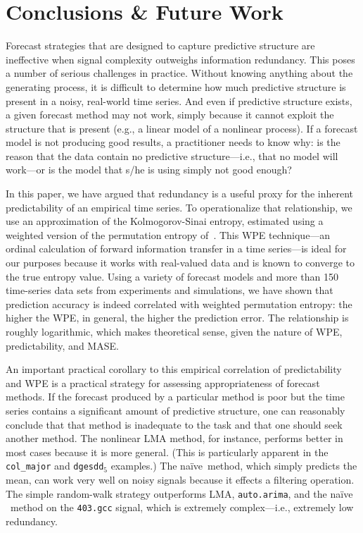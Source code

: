 \documentclass[%
pre,
reprint,
superscriptaddress,
showpacs,
nofootinbib,
nobibnotes,
 amsmath,amssymb,
 aps,
]{revtex4-1}
\newcommand{\gcc}{{\tt 403.gcc}\xspace}
\newcommand{\svdone}{{\tt dgesdd}$_1$\xspace}
\newcommand{\svdfive}{{\tt dgesdd$_5$}\xspace}
\newcommand{\arima}{{\tt auto.arima}\xspace}
\newcommand{\naive}{na\"ive}
\newcommand{\col}{{\tt col\_major}\xspace}
\begin{document}
\section{ Conclusions \& Future Work }\label{sec:conc}


Forecast strategies that are designed to capture predictive structure
are ineffective when signal complexity outweighs information
redundancy.  This poses a number of serious challenges in practice.
Without knowing anything about the generating process, it is difficult
to determine how much predictive structure is present in a noisy,
real-world time series.  And even if predictive structure exists, a
given forecast method may not work, simply because it cannot exploit
the structure that is present (e.g., a linear model of a nonlinear
process).  If a forecast model is not producing good results, a
practitioner needs to know why: is the reason that the data contain no
predictive structure---i.e., that no model will work---or is the model
that s/he is using simply not good enough?

In this paper, we have argued that redundancy is a useful proxy for
the inherent predictability of an empirical time series.  To
operationalize that relationship, we use an approximation of the
Kolmogorov-Sinai entropy, estimated using a weighted version of the
permutation entropy of~\cite{bandt2002per}.  This WPE technique---an
ordinal calculation of forward information transfer in a time
series---is ideal for our purposes because it works with real-valued
data and is known to converge to the true entropy value. Using a
variety of forecast models and more than 150 time-series data sets
from experiments and simulations, we have shown that prediction
accuracy is indeed correlated with weighted permutation entropy: the
higher the WPE, in general, the higher the prediction error.  The
relationship is roughly logarithmic, which makes theoretical sense,
given the nature of WPE, predictability, and MASE.

An important practical corollary to this empirical correlation of
predictability and WPE is a practical strategy for assessing
appropriateness of forecast methods.  If the forecast produced by a
particular method is poor but the time series contains a significant
amount of predictive structure, one can reasonably conclude that that
method is inadequate to the task and that one should seek another
method.  The nonlinear LMA method, for instance, performs better in
most cases because it is more general.  (This is particularly apparent
in the \col and \svdfive examples.)
The \naive ~method, which simply predicts the mean, can work very well
on noisy signals because it effects a filtering operation.  The simple
random-walk strategy outperforms LMA, \arima, and the \naive
~method on the \gcc signal, which is extremely complex---i.e.,
extremely low redundancy.
\end{document}
